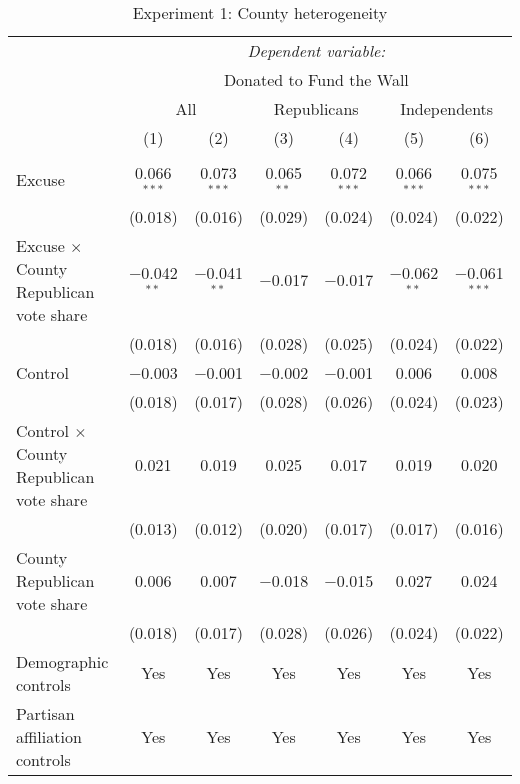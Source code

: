 
\begin{table}[!htbp] \centering 
  \caption{Experiment 1: County heterogeneity} 
  \label{t:2-cityheterogeneity} 
\begin{threeparttable}
\begin{tabular}{@{\hspace{5pt}}l@{\hspace{5pt}}cccccc} 
\toprule 
 & \multicolumn{6}{c}{\textit{Dependent variable:}} \\ 
\cmidrule(rr){2-7} 
 & \multicolumn{6}{c}{Donated to Fund the Wall} \\ 
 \cmidrule(rr){2-7}
 & \multicolumn{2}{c}{All} & \multicolumn{2}{c}{Republicans} & \multicolumn{2}{c}{Independents} \\ 
 & (1) & (2) & (3) & (4) & (5) & (6)\\ 
\midrule  
\\[-2.1ex] Excuse & 0.066$^{***}$ & 0.073$^{***}$ & 0.065$^{**}$ & 0.072$^{***}$ & 0.066$^{***}$ & 0.075$^{***}$ \\ 
  & (0.018) & (0.016) & (0.029) & (0.024) & (0.024) & (0.022) \\ 
 \addlinespace 
 Excuse $\times$ County Republican vote share & $-$0.042$^{**}$ & $-$0.041$^{**}$ & $-$0.017 & $-$0.017 & $-$0.062$^{**}$ & $-$0.061$^{***}$ \\ 
  & (0.018) & (0.016) & (0.028) & (0.025) & (0.024) & (0.022) \\ 
 \addlinespace 
 Control & $-$0.003 & $-$0.001 & $-$0.002 & $-$0.001 & 0.006 & 0.008 \\ 
  & (0.018) & (0.017) & (0.028) & (0.026) & (0.024) & (0.023) \\ 
 \addlinespace 
 Control $\times$ County Republican vote share & 0.021 & 0.019 & 0.025 & 0.017 & 0.019 & 0.020 \\ 
  & (0.013) & (0.012) & (0.020) & (0.017) & (0.017) & (0.016) \\ 
 \addlinespace 
 County Republican vote share & 0.006 & 0.007 & $-$0.018 & $-$0.015 & 0.027 & 0.024 \\ 
  & (0.018) & (0.017) & (0.028) & (0.026) & (0.024) & (0.022) \\ 
 \addlinespace 
\midrule  
Demographic controls & Yes & Yes & Yes & Yes & Yes & Yes \\ 
Partisan affiliation controls & Yes & Yes & Yes & Yes & Yes & Yes \\ 

\end{tabular}
\end{threeparttable}
\end{table}
